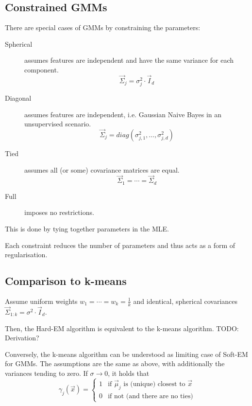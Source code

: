 \subsection{Constrained GMMs}
There are special cases of GMMs by constraining the parameters:
\begin{description}
    \item[Spherical] assumes features are independent and
    have the same variance for each component.
    \begin{equation*}
        \vec{\Sigma}_j = \sigma^2_j \cdot \vec{I}_d
    \end{equation*}
    
    \item[Diagonal] assumes features are independent,
    i.e. Gaussian Naive Bayes in an unsupervised scenario.
    \begin{equation*}
        \vec{\Sigma}_j = diag(\sigma_{j,1}^2, \dotsc, \sigma_{j,d}^2)
    \end{equation*}
    
    \item[Tied] assumes all (or some) 
    covariance matrices are equal.
    \begin{equation*}
        \vec{\Sigma}_1 = \dotsb = \vec{\Sigma}_d
    \end{equation*}
    
    \item[Full] imposes no restrictions.
\end{description}

This is done by tying together parameters in the MLE.

Each constraint reduces the number of parameters and thus
acts as a form of regularisation.


\subsection{Comparison to k-means}
Assume uniform weights $w_1 = \dotsb = w_k = \frac{1}{k}$
and identical, spherical covariances
$\vec{\Sigma}_{1:k} = \sigma^2 \cdot \vec{I}_d$.

Then, the Hard-EM algorithm is equivalent to the
k-means algorithm.
TODO: Derivation?

Conversely, the k-means algorithm can be understood
as limiting case of Soft-EM for GMMs.
The assumptions are the same as above,
with additionally the variances tending to zero.
If $\sigma \to 0$, it holds that
\begin{equation*}
    \gamma_j(\vec{x}) =
    \begin{cases}
        1 & \text{if $\vec{\mu}_j$ is (unique) closest to $\vec{x}$} \\
        0 & \text{if not (and there are no ties)}
    \end{cases}
\end{equation*}

